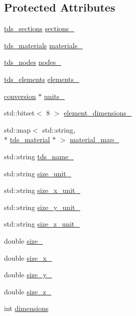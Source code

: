 \subsection*{Protected Attributes}
\begin{DoxyCompactItemize}
\item 
\hyperlink{tds__parts_8hh_aef503d0ac251112b915fc3a8918962f2}{tds\-\_\-sections} \hyperlink{classtds_aea3487dc26061f4f2fe815bc06bf8e8d}{sections\-\_\-}
\item 
\hyperlink{tds__parts_8hh_a972ae401709b50fd79befb06dd952170}{tds\-\_\-materials} \hyperlink{classtds_a67a9a18e5abe34aa5949862feb142468}{materials\-\_\-}
\item 
\hyperlink{tds__parts_8hh_ad445cf91d41fc0e37fcaf259adec00ef}{tds\-\_\-nodes} \hyperlink{classtds_a17991ace2c272d964099042862178d8d}{nodes\-\_\-}
\item 
\hyperlink{tds__parts_8hh_af35ca3b18f7ed6e38a9bfb5639d5a23e}{tds\-\_\-elements} \hyperlink{classtds_ae68472e797b37e20ac491ac8e6b5b911}{elements\-\_\-}
\item 
\hyperlink{classconversion}{conversion} $\ast$ \hyperlink{classtds_a995cf6b41f841a319beee5956ee3092a}{units\-\_\-}
\item 
std\-::bitset$<$ 8 $>$ \hyperlink{classtds_ae110d4c4170a9197aaac3de482dfd3df}{element\-\_\-dimensions\-\_\-}
\item 
std\-::map$<$ std\-::string, \\*
\hyperlink{classtds__material}{tds\-\_\-material} $\ast$ $>$ \hyperlink{classtds_a84e25b033be5370a9ebf8446af204189}{material\-\_\-map\-\_\-}
\item 
std\-::string \hyperlink{classtds_a81d050e8f4824b068943233983a18c72}{tds\-\_\-name\-\_\-}
\item 
std\-::string \hyperlink{classtds_ae8e6d5fc35c262760343c8ab7e5544f7}{size\-\_\-unit\-\_\-}
\item 
std\-::string \hyperlink{classtds_a95fdcbfe8def753d955fbc877aaa6e7e}{size\-\_\-x\-\_\-unit\-\_\-}
\item 
std\-::string \hyperlink{classtds_a8d15dd98b3afae8f6dc2d10da81b4822}{size\-\_\-y\-\_\-unit\-\_\-}
\item 
std\-::string \hyperlink{classtds_a01eaf6d0f842d03707ede1d581679665}{size\-\_\-z\-\_\-unit\-\_\-}
\item 
double \hyperlink{classtds_a10d8009264fbbdf6e1f251126c95722b}{size\-\_\-}
\item 
double \hyperlink{classtds_abaf62143b01769f22bfe00a06b208499}{size\-\_\-x\-\_\-}
\item 
double \hyperlink{classtds_a3d5ebc44c474eba100d5889d6e61596e}{size\-\_\-y\-\_\-}
\item 
double \hyperlink{classtds_a89da6f5b2a584866959d10d491b36c44}{size\-\_\-z\-\_\-}
\item 
int \hyperlink{classtds_ac48ac015df4afa958eac52682954802c}{dimensions}
\end{DoxyCompactItemize}


